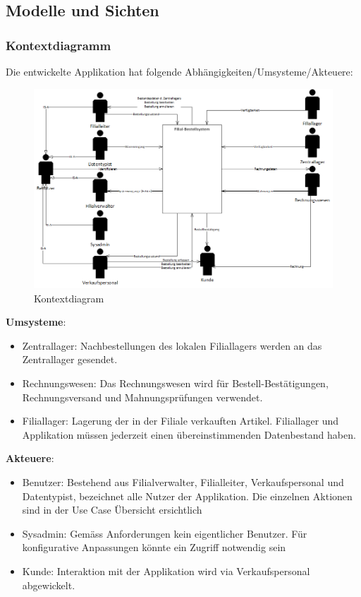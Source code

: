 \subsection{Modelle und Sichten}

\subsubsection{Kontextdiagramm}
Die entwickelte Applikation hat folgende Abhängigkeiten/Umsysteme/Akteuere:
\begin{figure}[H]
	\includegraphics[width=1.0\linewidth]{Images/kontextdiagram}
	\caption{Kontextdiagram}
	\label{fig:kontextdiagram}
\end{figure}

\textbf{Umsysteme}:
\begin{itemize}
\item Zentrallager: Nachbestellungen des lokalen Filiallagers werden an das Zentrallager gesendet.
\item Rechnungswesen: Das Rechnungswesen wird für Bestell-Bestätigungen, Rechnungsversand und Mahnungsprüfungen verwendet.
\item Filiallager: Lagerung der in der Filiale verkauften Artikel. Filiallager und Applikation müssen jederzeit einen übereinstimmenden Datenbestand haben.
\end{itemize}

\textbf{Akteuere}:
\begin{itemize}
\item Benutzer: Bestehend aus Filialverwalter, Filialleiter, Verkaufspersonal und Datentypist, bezeichnet alle Nutzer der Applikation. Die einzelnen Aktionen sind in der Use Case Übersicht ersichtlich
\item Sysadmin: Gemäss Anforderungen kein eigentlicher Benutzer. Für konfigurative Anpassungen könnte ein Zugriff notwendig sein
\item Kunde: Interaktion mit der Applikation wird via Verkaufspersonal abgewickelt.
\end{itemize}

